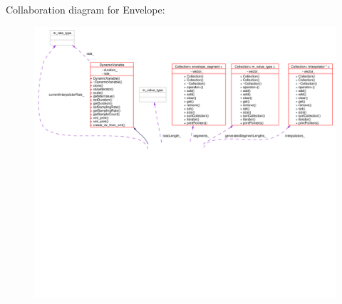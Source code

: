 Collaboration diagram for Envelope:\begin{figure}[H]
\begin{center}
\leavevmode
\includegraphics[width=420pt]{classEnvelope__coll__graph}
\end{center}
\end{figure}
